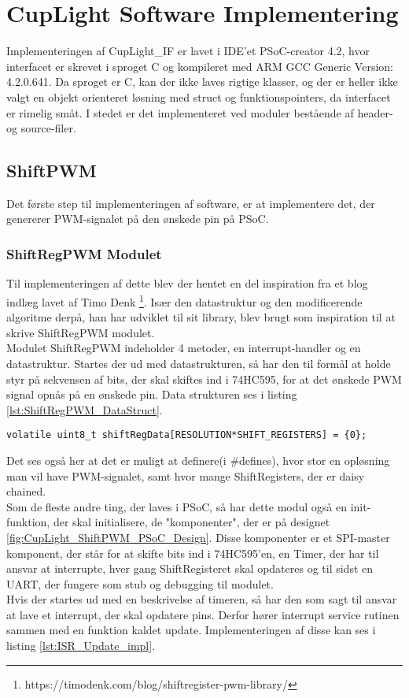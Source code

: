 \documentclass[Softwaredesign/Softwaredesign_main.tex]{subfiles}
\begin{document}
\section{CupLight Software Implementering}
Implementeringen af CupLight\_IF er lavet i IDE'et PSoC-creator 4.2, hvor interfacet er skrevet i sproget C og kompileret med ARM GCC Generic Version: 4.2.0.641. Da sproget er C, kan der ikke laves rigtige klasser, og der er heller ikke valgt en objekt orienteret løsning med struct og funktionspointers, da interfacet er rimelig småt. I stedet er det implementeret ved moduler bestående af header- og source-filer.
\subsection{ShiftPWM}
Det første step til implementeringen af software, er at implementere det, der genererer PWM-signalet på den ønskede pin på PSoC. 
\subsubsection{ShiftRegPWM Modulet}
Til implementeringen af dette blev der hentet en del inspiration fra et blog indlæg lavet af Timo Denk \footnote{https://timodenk.com/blog/shiftregister-pwm-library/}. Især den datastruktur og den modificerende algoritme derpå,  han har udviklet til sit library, blev brugt som inspiration til at skrive ShiftRegPWM modulet. 
\\Modulet ShiftRegPWM indeholder 4 metoder, en interrupt-handler og en datastruktur. Startes der ud med datastrukturen, så har den  til formål at holde styr på sekvensen af bits, der skal skiftes ind i 74HC595, for at det ønskede PWM signal opnås på en ønskede pin. Data strukturen ses i listing \ref{lst:ShiftRegPWM_DataStruct}.

\begin{lstlisting}[caption={Datastruktur for ShiftRegPWM}, label={lst:ShiftRegPWM_DataStruct}]
volatile uint8_t shiftRegData[RESOLUTION*SHIFT_REGISTERS] = {0};
\end{lstlisting}

Det ses også her at det er muligt at definere(i #defines), hvor stor en opløsning man vil have PWM-signalet, samt hvor mange ShiftRegisters, der er daisy chained. 
\\Som de fleste andre ting, der laves i PSoC, så har dette modul også en init-funktion, der skal initialisere, de "komponenter", der er på designet \ref{fig:CupLight_ShiftPWM_PSoC_Design}. Disse komponenter er et SPI-master komponent, der står for at skifte bits ind i 74HC595'en, en Timer, der har til ansvar at interrupte, hver gang ShiftRegisteret skal opdateres og til sidst en UART, der fungere som stub og debugging til modulet.
\\Hvis der startes ud med en beskrivelse af timeren, så har den som sagt til ansvar at lave et interrupt, der skal opdatere pins. Derfor hører interrupt service rutinen sammen med en funktion kaldet update. Implementeringen af disse kan ses i listing \ref{lst:ISR_Update_impl}.
\end{document}

